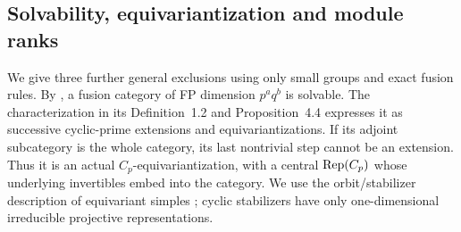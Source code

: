 \subsection{Solvability, equivariantization and module ranks}
We give three further general exclusions using only small groups and exact fusion rules. By \cite[Theorem~1.6]{ENOSolvable}, a fusion category of FP dimension $p^a q^b$ is solvable. The characterization in its Definition~1.2 and Proposition~4.4 expresses it as successive cyclic-prime extensions and equivariantizations. If its adjoint subcategory is the whole category, its last nontrivial step cannot be an extension. Thus it is an actual $C_p$-equivariantization, with a central $\operatorname{Rep}(C_p)$ whose underlying invertibles embed into the category. We use the orbit/stabilizer description of equivariant simples \cite[Section~2]{BurciuNatale}; cyclic stabilizers have only one-dimensional irreducible projective representations.

